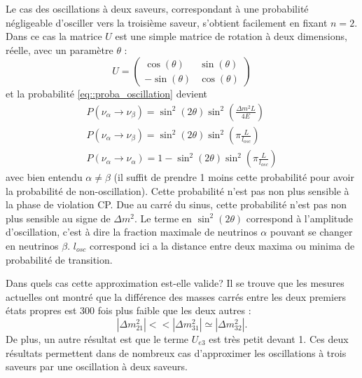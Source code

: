             Le cas des oscillations à deux saveurs, correspondant à une probabilité négligeable d'osciller vers la troisième saveur, s'obtient facilement en fixant $n=2$. Dans ce cas la matrice $U$ est une simple matrice de rotation à deux dimensions, réelle, avec un paramètre $\theta$ :
            \begin{equation}\label{eq::two_flavor_pmns}
                U = \left(\begin{matrix}
                    \cos(\theta) & \sin(\theta) \\
                    -\sin(\theta) & \cos(\theta)
                \end{matrix}\right)
            \end{equation}
            et la probabilité \eqref{eq::proba_oscillation} devient
            \begin{eqnarray}
                \label{eq::two_flavors}
                P(\nu_{\alpha}\to\nu_{\beta}) = \sin^2(2\theta)\sin^2\left(\frac{\Delta m^2 L}{4E}\right) \\ 
                \label{eq::two_flavors_length}
                P(\nu_{\alpha}\to\nu_{\beta}) = \sin^2(2\theta)\sin^2\left(\pi\frac{L}{l_{osc}}\right) \\
                \label{eq::two_flavors_survival}
                P(\nu_{\alpha}\to\nu_{\alpha}) = 1- \sin^2(2\theta)\sin^2\left(\pi\frac{L}{l_{osc}}\right)
            \end{eqnarray}
            avec bien entendu $\alpha\ne \beta$ (il suffit de prendre 1 moins cette probabilité pour avoir la probabilité de non-oscillation). Cette probabilité n'est pas non plus sensible à la phase de violation CP. Due au carré du sinus, cette probabilité n'est pas non plus sensible au signe de $\Delta m^2$. Le terme en $\sin^2(2\theta)$ correspond à l'amplitude d'oscillation, c'est à dire la fraction maximale de neutrinos $\alpha$ pouvant se changer en neutrinos $\beta$. $l_{osc}$ correspond ici a la distance entre deux maxima ou minima de probabilité de transition.
            
            Dans quels cas cette approximation est-elle valide? Il se trouve que les mesures actuelles ont montré que la différence des masses carrés entre les deux premiers états propres est 300 fois plus faible que les deux autres : 
            \begin{equation}
                |\Delta m^2_{21}| << |\Delta m^2_{31}| \simeq |\Delta m^2_{32}|.
            \end{equation}
            De plus, un autre résultat est que le terme $U_{e3}$ est très petit devant 1. Ces deux résultats permettent dans de nombreux cas d'approximer les oscillations à trois saveurs par une oscillation à deux saveurs.
            
